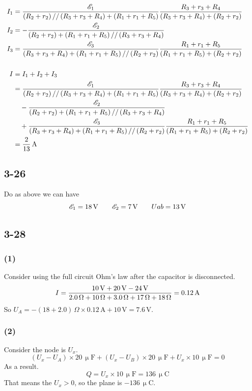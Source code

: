 \documentclass[a4paper,11pt]{amsart}
\theoremstyle{definition}
\begin{document}
	\begin{align*}
		I_1&=\frac{\mathscr{E} _1}{\left( R_2+r_2 \right) //\left( R_3+r_3+R_4 \right) +\left( R_1+r_1+R_5 \right)}\frac{R_3+r_3+R_4}{\left( R_3+r_3+R_4 \right) +\left( R_2+r_2 \right)}
		\\
		I_2&=-\frac{\mathscr{E} _2}{\left( R_2+r_2 \right) +\left( R_1+r_1+R_5 \right) //\left( R_3+r_3+R_4 \right)}
		\\
		I_3&=\frac{\mathscr{E} _3}{\left( R_3+r_3+R_4 \right) +\left( R_1+r_1+R_5 \right) //\left( R_2+r_2 \right)}\frac{R_1+r_1+R_5}{\left( R_1+r_1+R_5 \right) +\left( R_2+r_2 \right)}
		\\\\
		I&=I_1+I_2+I_3
		\\
		&=\frac{\mathscr{E} _1}{\left( R_2+r_2 \right) //\left( R_3+r_3+R_4 \right) +\left( R_1+r_1+R_5 \right)}\frac{R_3+r_3+R_4}{\left( R_3+r_3+R_4 \right) +\left( R_2+r_2 \right)}
		\\
		&\quad-\frac{\mathscr{E} _2}{\left( R_2+r_2 \right) +\left( R_1+r_1+R_5 \right) //\left( R_3+r_3+R_4 \right)}
		\\
		&\quad+\frac{\mathscr{E} _3}{\left( R_3+r_3+R_4 \right) +\left( R_1+r_1+R_5 \right) //\left( R_2+r_2 \right)}\frac{R_1+r_1+R_5}{\left( R_1+r_1+R_5 \right) +\left( R_2+r_2 \right)}
		\\
		&=\dfrac{2}{13}\thinspace\mathrm{A}
	\end{align*}
	\subsection*{3-26}
	Do as above we can have
	$$
	\mathscr{E}_1=18\thinspace\mathrm{V}\qquad\mathscr{E}_2=7\thinspace\mathrm{V}\qquad U{ab}=13\thinspace\mathrm{V}
	$$
	\subsection*{3-28}
	\subsubsection*{(1)}
	Consider using the full circuit Ohm's law after the capacitor is disconnected.
	$$
	I=\frac{10\thinspace\mathrm{V}+20\,\mathrm{V}-24\,\mathrm{V}}{2.0\,\Omega +10\,\Omega +3.0\,\Omega +17\,\Omega +18\,\Omega}=0.12\,\mathrm{A}
	$$
	So $U_A=-(18+2.0)\,\Omega\times0.12\,\mathrm{A}+10\,\mathrm{V}=7.6\,\mathrm{V}$.
	\subsubsection*{(2)}
	Consider the node is $U_x$.
	$$
	\left( U_x-U_A \right) \times 20\,\upmu\mathrm{F}+\left( U_x-U_B \right) \times 20\,\upmu\mathrm{F}+U_x\times 10\,\upmu\mathrm{F}=0
	$$
	As a result.
	$$
	Q=U_x\times10\,\upmu\mathrm{F}=136\,\upmu\mathrm{C}
	$$
	That means the $U_x>0$, so the plane is $-136\,\upmu\mathrm{C}$.
\end{document}
